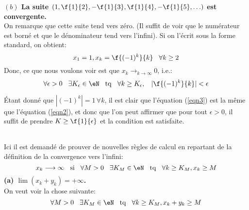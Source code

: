 \vspace{1cm}
{\bf $(b)$ La suite $(1, \f{1}{2}, -\f{1}{3},  \f{1}{4}, -\f{1}{5}, \ldots )$ est convergente.}\\

\noindent On remarque que cette suite tend vers zéro. (Il suffit de voir que le numérateur est borné et que le dénominateur  tend vers l'infini). Si on l'écrit  sous la forme standard, on obtient:                 
              \[x_1 = 1, x_k = \f{(-1)^k}{k} \hspace{0.3cm} \forall k\geq 2\] 
Donc, ce que nous voulons voir est que $x_k \longrightarrow_{k\rightarrow  \infty} 0$, i.e.: 
   \begin{equation}\label{eqn3}\forall \epsilon >0 \hspace{0,3cm} \exists K_\epsilon \in \eN \hspace{0,3cm} {\rm tq}                       
       \hspace{0,3cm}  \forall k\geq K_\epsilon,  \hspace{0,3cm} |\f{(-1)^k}{k}|<\epsilon\end{equation}
       
\noindent Étant donné que $|(-1)^k| = 1 \, \forall k$, il est clair que l'équation (\ref{eqn3}) est la même que l'équation (\ref{eqn2}), et donc que l'on peut affirmer que pour tout $\epsilon > 0$, il suffit de prendre $K\geq \f{1}{\epsilon}$ et la condition est satisfaite.

\\

Ici il est demandé de prouver de nouvelles règles de calcul en repartant de la définition de la convergence vers l'infini:
\begin{equation}
 \label{eqnconvinfGene} x_k \longrightarrow \infty \hspace{0.3cm} {\rm si} \hspace{0.3cm}  \forall M > 0 \hspace{0.3cm} \exists K_M \in \eN \hspace{0.3cm} {\rm tq} \hspace{0.3cm} \forall k \geq K_M, x_k \geq M \end{equation}
{\bf (a) $ \lim(x_k+y_k) = +\infty$.}\\

\noindent On veut voir  la chose suivante:
\begin{equation}\label{eqnconvinfCasA}
   \forall M > 0 \hspace{0.3cm} \exists K_M \in \eN \hspace{0.3cm} {\rm tq} \hspace{0.3cm} \forall k \geq K_M, x_k + y_k \geq M 
  \end{equation}

